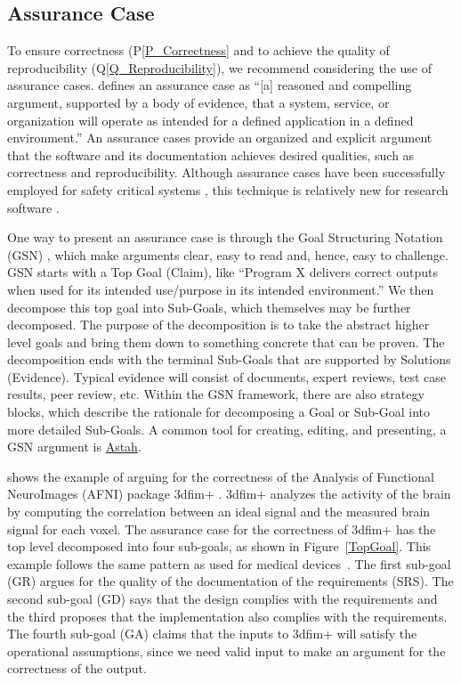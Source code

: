 \documentclass[final, 3p, times, authoryear]{elsarticle}
\newcommand{\ppref}[1]{P\ref{#1}}
\newcommand{\qref}[1]{Q\ref{#1}}
\begin{document}
\subsection{Assurance Case} \label{AssuranceCases}

To ensure correctness (\ppref{P_Correctness} and to achieve the quality of
reproducibility (\qref{Q_Reproducibility}), we recommend considering the use of
assurance cases.  \citet{RinehartEtAl2015} defines an assurance case as ``[a]
reasoned and compelling argument, supported by a body of evidence, that a
system, service, or organization will operate as intended for a defined
application in a defined environment.''  An assurance cases provide an organized
and explicit argument that the software and its documentation achieves desired
qualities, such as correctness and reproducibility.  Although assurance cases
have been successfully employed for safety critical systems
\citep{RinehartEtAl2015}, this technique is relatively new for research software
\citep{SmithEtAl2020_AC, Smith2018}.

One way to present an assurance case is through the Goal Structuring Notation
(GSN) \cite{Spriggs2012}, which make arguments clear, easy to read and, hence,
easy to challenge. GSN starts with a Top Goal (Claim), like ``Program X delivers
correct outputs when used for its intended use/purpose in its intended
environment.''  We then decompose this top goal into Sub-Goals, which themselves
may be further decomposed.  The purpose of the decomposition is to take the
abstract higher level goals and bring them down to something concrete that can
be proven.  The decomposition ends with the terminal Sub-Goals that are
supported by Solutions (Evidence). Typical evidence will consist of documents,
expert reviews, test case results, peer review, etc.  Within the GSN framework,
there are also strategy blocks, which describe the rationale for decomposing a
Goal or Sub-Goal into more detailed Sub-Goals. A common tool for creating,
editing, and presenting, a GSN argument is \href{https://astah.net/} {Astah}.  

\citet{SmithEtAl2020_AC} shows the example of arguing for the correctness of the
Analysis of Functional NeuroImages (AFNI) package 3dfim+ \citep{Ward2000}.
3dfim+ analyzes the activity of the brain by computing the correlation between
an ideal signal and the measured brain signal for each voxel. The assurance case
for the correctness of 3dfim+ has the top level decomposed into four sub-goals,
as shown in Figure~\ref{TopGoal}.  This example follows the same pattern as used
for medical devices~\cite{Wassyng2015}.  The first sub-goal (GR) argues for the
quality of the documentation of the requirements (SRS).  The second sub-goal
(GD) says that the design complies with the requirements and the third proposes
that the implementation also complies with the requirements.  The fourth
sub-goal (GA) claims that the inputs to 3dfim+ will satisfy the operational
assumptions, since we need valid input to make an argument for the correctness
of the output.
\end{document}
